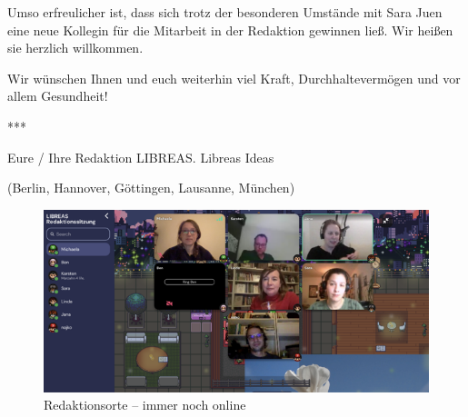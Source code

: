 \documentclass[a4paper,
fontsize=11pt,
oneside,
numbers=noperiodatend,
parskip=half-,
bibliography=totoc,
final
]{scrartcl}
\begin{document}
Umso erfreulicher ist, dass sich trotz der besonderen Umstände mit Sara
Juen eine neue Kollegin für die Mitarbeit in der Redaktion gewinnen
ließ. Wir heißen sie herzlich willkommen.

Wir wünschen Ihnen und euch weiterhin viel Kraft, Durchhaltevermögen und
vor allem Gesundheit!

***

Eure / Ihre Redaktion LIBREAS. Libreas Ideas

(Berlin, Hannover, Göttingen, Lausanne, München)

\begin{figure}[t]
\centering
\includegraphics[width=.9\textwidth]{img/img2}
\caption{Redaktionsorte -- immer noch online}
\end{figure}
\end{document}
